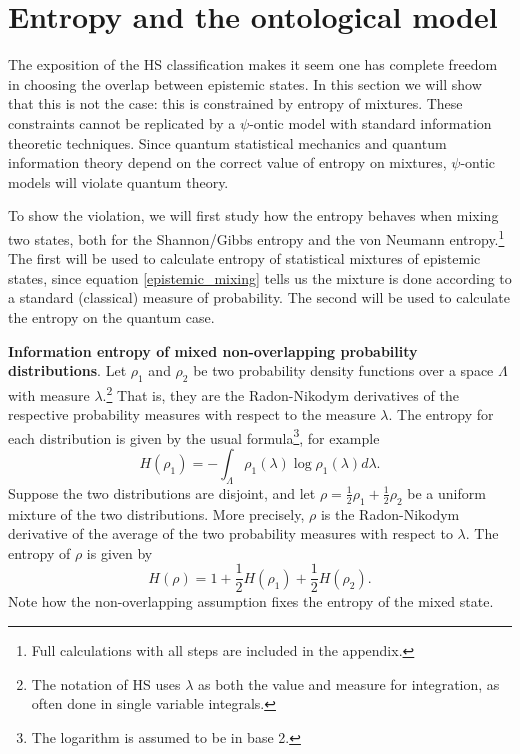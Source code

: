 \documentclass[10pt,twocolumn, nofootinbib]{revtex4-2}
\begin{document}
\section{Entropy and the ontological model}

The exposition of the HS classification makes it seem one has complete freedom in choosing the overlap between epistemic states. In this section we will show that this is not the case: this is constrained by entropy of mixtures. These constraints cannot be replicated by a $\psi$-ontic model with standard information theoretic techniques. Since quantum statistical mechanics and quantum information theory depend on the correct value of entropy on mixtures, $\psi$-ontic models will violate quantum theory.

To show the violation, we will first study how the entropy behaves when mixing two states, both for the Shannon/Gibbs entropy and the von Neumann entropy.\footnote{Full calculations with all steps are included in the appendix.} The first will be used to calculate entropy of statistical mixtures of epistemic states, since equation \ref{epistemic_mixing} tells us the mixture is done according to a standard (classical) measure of probability. The second will be used to calculate the entropy on the quantum case.

\textbf{Information entropy of mixed non-overlapping probability distributions}. Let $\rho_1$ and $\rho_2$ be two probability density functions over a space $\Lambda$ with measure $\lambda$.\footnote{The notation of HS uses $\lambda$ as both the value and measure for integration, as often done in single variable integrals.} That is, they are the Radon-Nikodym derivatives of the respective probability measures with respect to the measure $\lambda$. The entropy for each distribution is given by the usual formula\footnote{The logarithm is assumed to be in base 2.}, for example
\begin{equation}\label{shannon_entropy}
	H(\rho_1) = - \int_\Lambda \rho_1(\lambda) \log \rho_1(\lambda) d\lambda.
\end{equation}
Suppose the two distributions are disjoint, and let $\rho = \frac{1}{2} \rho_1 + \frac{1}{2} \rho_2$ be a uniform mixture of the two distributions. More precisely, $\rho$ is the Radon-Nikodym derivative of the average of the two probability measures with respect to $\lambda$. The entropy of $\rho$ is given by
\begin{equation}\label{entropy_nonoverlap}
	H(\rho) = 1 + \frac{1}{2} H(\rho_1) + \frac{1}{2} H(\rho_2).
\end{equation}
Note how the non-overlapping assumption fixes the entropy of the mixed state. 
\end{document}
